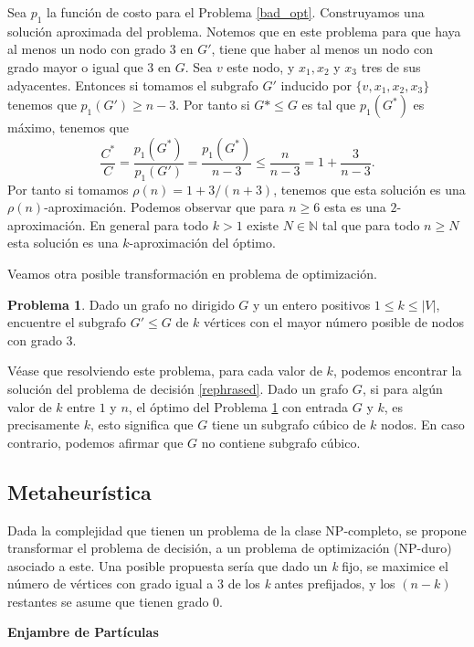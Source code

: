 \documentclass[10pt]{amsart}
\theoremstyle{definition}
\newtheorem{prob}[theorem]{Problema}
\numberwithin{equation}{section}
\newcommand{\nn}{\mathbb{N}}
\begin{document}
	Sea $p_1$ la funci\'on de costo para el Problema \ref{bad_opt}. Construyamos una soluci\'on aproximada del problema. Notemos que en este problema para que haya al menos un nodo con grado $3$ en $G'$, tiene que haber al menos un nodo con grado mayor o igual que $3$ en $G$.  Sea $v$ este nodo, y $x_1, x_2$ y $x_3$ tres de sus adyacentes. Entonces si tomamos el subgrafo $G'$ inducido por $\{v, x_1, x_2, x_3\}$ tenemos que $p_1(G') \ge n - 3$. Por tanto si $G* \le G$ es tal que $p_1(G^*)$ es m\'aximo, tenemos que 
	\[
	\frac{C^*}{C} = \frac{p_1(G^*)}{p_1(G')} = \frac{p_1(G^*)}{n - 3} \le \frac{n}{n-3} = 1 + \frac{3}{n - 3}.
	\]
	Por tanto si tomamos $\rho(n) = 1 + 3/(n + 3)$, tenemos que esta soluci\'on es una $\rho(n)$-aproximaci\'on. Podemos observar que para $n \ge 6$ esta es una $2$-aproximaci\'on. En general para todo $k > 1$ existe $N \in \nn$ tal que para todo $n \ge N$ esta soluci\'on es una $k$-aproximaci\'on del \'optimo.
	
	Veamos otra posible transformaci\'on en problema de optimizaci\'on. 
	
	\begin{prob} \label{best_appx}
		Dado un grafo no dirigido $G$ y un entero positivos $1 \le k \le |V|$, encuentre el subgrafo $G' \le G$ de $k$ v\'ertices con el mayor n\'umero posible de nodos con grado $3$.
	\end{prob}

	V\'ease que resolviendo este problema, para cada valor de $k$, podemos encontrar la soluci\'on del problema de decisi\'on \ref{rephrased}. Dado un grafo $G$, si para alg\'un valor de $k$ entre $1$ y $n$, el \'optimo del Problema \ref{best_appx} con entrada $G$ y $k$, es precisamente $k$, esto significa que $G$ tiene un subgrafo c\'ubico de $k$ nodos. En caso contrario, podemos afirmar que $G$ no contiene subgrafo c\'ubico.
	
	\subsection{Metaheurística}
	
	Dada la complejidad que tienen un problema de la clase NP-completo, se propone transformar 
	el problema de decisión, a un problema de optimización (NP-duro) asociado a este. Una posible
	propuesta sería que dado un \emph{k} fijo, se maximice el número de vértices con grado igual a 
	3 de los \emph{k} antes prefijados, y los $(n-k)$ restantes se asume que tienen grado 0.
	
	\textbf{Enjambre de Partículas}
	
\end{document}
